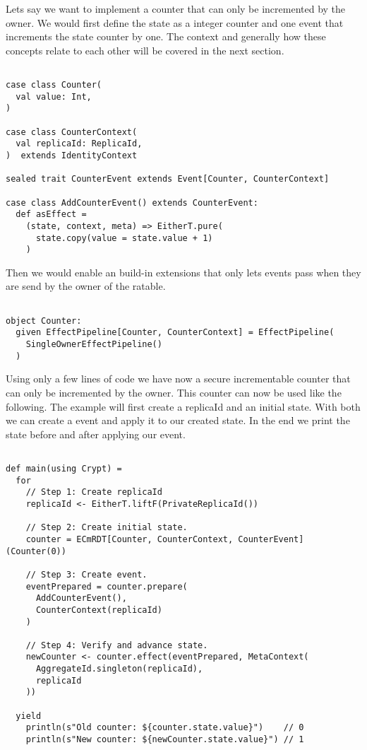 \documentclass[
	ngerman,
	ruledheaders=section,   %
	class=report,		    %
	thesis={type=bachelor}, %
	accentcolor=9c,			%
	custommargins=false,    %
	marginpar=false,        %
	parskip=half-,          %
	fontsize=11pt,          %
]{tudapub}
\begin{document}
Lets say we want to implement a counter that can only be incremented by the owner. We would first define the state as a integer counter and one event that increments the state counter by one. The context and generally how these concepts relate to each other will be covered in the next section.

\begin{lstlisting}
    
case class Counter(
  val value: Int,
) 

case class CounterContext(
  val replicaId: ReplicaId,
)  extends IdentityContext

sealed trait CounterEvent extends Event[Counter, CounterContext]

case class AddCounterEvent() extends CounterEvent:
  def asEffect =
    (state, context, meta) => EitherT.pure(
      state.copy(value = state.value + 1)
    )

\end{lstlisting}

Then we would enable an build-in extensions that only lets events pass when they are send by the owner of the ratable.

\begin{lstlisting}

object Counter:
  given EffectPipeline[Counter, CounterContext] = EffectPipeline(
    SingleOwnerEffectPipeline()
  )

\end{lstlisting}

Using only a few lines of code we have now a secure incrementable counter that can only be incremented by the owner. This counter can now be used like the following. The example will first create a replicaId and an initial state. With both we can create a event and apply it to our created state. In the end we print the state before and after applying our event.

\begin{lstlisting}
    
def main(using Crypt) = 
  for
    // Step 1: Create replicaId
    replicaId <- EitherT.liftF(PrivateReplicaId())

    // Step 2: Create initial state.
    counter = ECmRDT[Counter, CounterContext, CounterEvent](Counter(0))

    // Step 3: Create event.
    eventPrepared = counter.prepare(
      AddCounterEvent(),
      CounterContext(replicaId)
    )

    // Step 4: Verify and advance state.
    newCounter <- counter.effect(eventPrepared, MetaContext(
      AggregateId.singleton(replicaId), 
      replicaId
    ))

  yield
    println(s"Old counter: ${counter.state.value}")    // 0
    println(s"New counter: ${newCounter.state.value}") // 1

\end{lstlisting}
\end{document}
